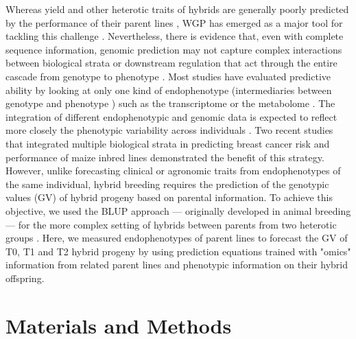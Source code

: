 \documentclass[12pt,titlepage]{article}
\begin{document}
Whereas yield and other heterotic traits of hybrids are generally poorly
predicted by the performance of their parent lines \cite{Melchinger1998}, WGP
has emerged as a major tool for tackling this challenge
\cite{Massman2013,Technow2014}.
Nevertheless, there is evidence that, even with complete sequence information,
genomic prediction may not capture complex interactions between biological 
strata or downstream regulation that act through the entire cascade from 
genotype to phenotype \cite{Dalchau2011,Zhu2012,Rudd2015,Ritchie2015b}.
Most studies have evaluated predictive ability by looking at only one kind of 
endophenotype (intermediaries between genotype and phenotype 
\cite{Gottesman2003,Mackay2009}) such as the transcriptome 
\cite{Swanson-Wagner2006,Frisch2010,Xu2016} or the metabolome 
\cite{Meyer2007,Xu2016,Dan2016}.
The integration of different endophenotypic and genomic data is expected to
reflect more closely the phenotypic variability across individuals 
\cite{Mackay2009,Patti2012,Civelek2014}. 
Two recent studies that integrated multiple biological strata in predicting 
breast cancer risk \cite{Vazquez2016} and performance of maize inbred lines
\cite{Guo2016} demonstrated the benefit of this strategy.
However, unlike forecasting clinical or agronomic traits from endophenotypes of 
the same individual, hybrid breeding requires the prediction of the genotypic 
values (GV) of hybrid progeny based on parental information.
To achieve this objective, we used the BLUP approach --- originally developed in
animal breeding \cite{Henderson1984} --- for the more complex setting of hybrids 
between parents from two heterotic groups 
\cite{Bernardo1994,Bernardo1995,Bernardo1996,Massman2013}.
Here, we measured endophenotypes of parent lines to forecast the GV of
T0, T1 and T2 hybrid progeny by using prediction equations trained with "omics" 
information from related parent lines and phenotypic information on their
hybrid offspring.







\section{Materials and Methods}
\end{document}
